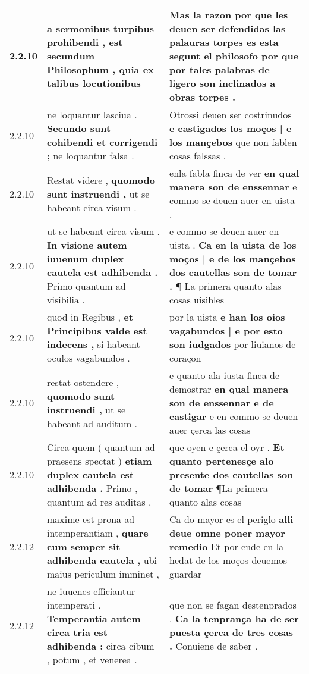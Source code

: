 \begin{tabular}{|p{1cm}|p{6.5cm}|p{6.5cm}|}
2.2.10 & a sermonibus turpibus prohibendi , \textbf{ est secundum Philosophum , } quia ex talibus locutionibus & Mas la razon por que les deuen ser defendidas las palauras torpes \textbf{ es esta segunt el philosofo } por que por tales palabras de ligero son inclinados a obras torpes . \\\hline
2.2.10 & ne loquantur lasciua . \textbf{ Secundo sunt cohibendi et corrigendi ; } ne loquantur falsa . & Otrossi deuen ser costrinudos \textbf{ e castigados los moços | e los mançebos } que non fablen cosas falssas . \\\hline
2.2.10 & Restat videre , \textbf{ quomodo sunt instruendi , } ut se habeant circa visum . & enla fabla finca de ver \textbf{ en qual manera son de enssennar } e commo se deuen auer en uista . \\\hline
2.2.10 & ut se habeant circa visum . \textbf{ In visione autem iuuenum duplex cautela est adhibenda . } Primo quantum ad visibilia . & e commo se deuen auer en uista . \textbf{ Ca en la uista de los moços | e de los mançebos dos cautellas son de tomar . } ¶ La primera quanto alas cosas uisibles \\\hline
2.2.10 & quod in Regibus , \textbf{ et Principibus valde est indecens , } si habeant oculos vagabundos . & por la uista \textbf{ e han los oios vagabundos | e por esto son iudgados } por liuianos de coraçon \\\hline
2.2.10 & restat ostendere , \textbf{ quomodo sunt instruendi , } ut se habeant ad auditum . & e quanto ala iusta finca de demostrar \textbf{ en qual manera son de enssennar e de castigar } e en commo se deuen auer çerca las cosas \\\hline
2.2.10 & Circa quem ( quantum ad praesens spectat ) \textbf{ etiam duplex cautela est adhibenda . } Primo , quantum ad res auditas . & que oyen e çerca el oyr . \textbf{ Et quanto pertenesçe alo presente dos cautellas son de tomar } ¶La primera quanto alas cosas \\\hline
2.2.12 & maxime est prona ad intemperantiam , \textbf{ quare cum semper sit adhibenda cautela , } ubi maius periculum imminet , & Ca do mayor es el periglo \textbf{ alli deue omne poner mayor remedio } Et por ende en la hedat de los moços deuemos guardar \\\hline
2.2.12 & ne iuuenes efficiantur intemperati . \textbf{ Temperantia autem circa tria est adhibenda : } circa cibum , potum , et venerea . & que non se fagan destenprados . \textbf{ Ca la tenprança ha de ser puesta çerca de tres cosas . } Conuiene de saber . \\\hline

\end{tabular}
